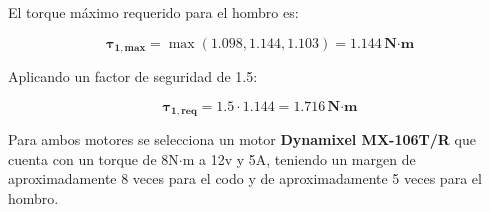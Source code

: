 El torque máximo requerido para el hombro es:

\begin{equation}
\mathbf{\tau_{1,max}} = \max(1.098, 1.144, 1.103) = \mathbf{1.144 \, \textbf{N·m} }
\end{equation}

Aplicando un factor de seguridad de 1.5:

\begin{equation}
\mathbf{\tau_{1,req}} = 1.5 \cdot 1.144 = \mathbf{1.716 \, \textbf{N·m} }
\end{equation}




Para ambos motores se selecciona un motor \textbf{Dynamixel MX-106T/R} que cuenta con un torque de 8N$\cdot$m a 12v y 5A, teniendo un margen de aproximadamente 8 veces para el codo y de aproximadamente 5 veces para el hombro.

